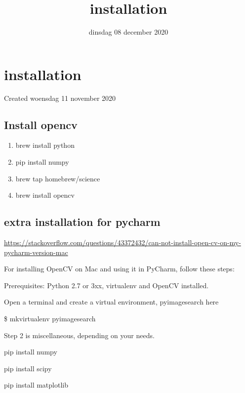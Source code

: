\documentclass{scrartcl}
\title{installation}
\date{dinsdag 08 december 2020}
\author{}
\begin{document}
\maketitle

		\section{installation}

Created woensdag 11 november 2020



\subsection{Install opencv}

\begin{enumerate}[1]
\item brew install python
\item pip install numpy
\item brew tap homebrew/science
\item brew install opencv
\end{enumerate}


\subsection{extra installation for pycharm}

\href{https://stackoverflow.com/questions/43372432/can-not-install-open-cv-on-my-pycharm-version-mac}{https://stackoverflow.com/questions/43372432/can-not-install-open-cv-on-my-pycharm-version-mac}

For installing OpenCV on Mac and using it in PyCharm, follow these steps:



Prerequisites: Python 2.7 or 3xx, virtualenv and OpenCV installed.



Open a terminal and create a virtual environment, pyimagesearch here



\$  mkvirtualenv pyimagesearch

Step 2 is miscellaneous, depending on your needs.



pip install numpy



pip install scipy



pip install matplotlib
\end{document}
